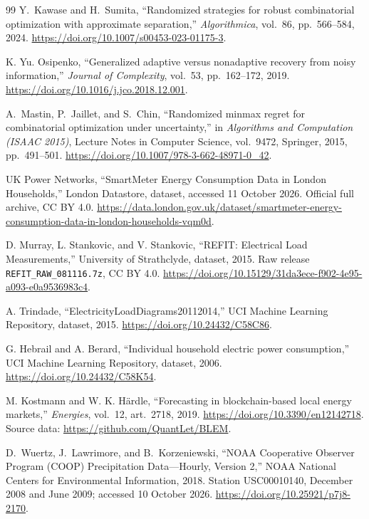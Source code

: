 \documentclass[12pt]{article}
\begin{document}
\begin{thebibliography}{99}
Y.~Kawase and H.~Sumita, ``Randomized strategies for robust combinatorial
optimization with approximate separation,'' \emph{Algorithmica}, vol.~86,
pp.~566--584, 2024. \url{https://doi.org/10.1007/s00453-023-01175-3}.

 K. Yu. Osipenko,
``Generalized adaptive versus nonadaptive recovery from noisy information,''
\emph{Journal of Complexity}, vol.~53, pp.~162--172, 2019.
\url{https://doi.org/10.1016/j.jco.2018.12.001}.

A.~Mastin, P.~Jaillet, and S.~Chin, ``Randomized minmax regret for
combinatorial optimization under uncertainty,'' in \emph{Algorithms and
Computation (ISAAC 2015)}, Lecture Notes in Computer Science, vol.~9472,
Springer, 2015, pp.~491--501.
\url{https://doi.org/10.1007/978-3-662-48971-0_42}.


 UK Power Networks, ``SmartMeter Energy Consumption Data in
London Households,'' London Datastore, dataset, accessed 11 October 2026.
Official full archive, CC BY 4.0.
\url{https://data.london.gov.uk/dataset/smartmeter-energy-consumption-data-in-london-households-vqm0d}.

 D. Murray, L. Stankovic, and V. Stankovic,
``REFIT: Electrical Load Measurements,'' University of Strathclyde, dataset,
2015. Raw release \texttt{REFIT\_RAW\_081116.7z}, CC BY 4.0.
\url{https://doi.org/10.15129/31da3ece-f902-4e95-a093-e0a9536983c4}.

 A. Trindade, ``ElectricityLoadDiagrams20112014,''
UCI Machine Learning Repository, dataset, 2015.
\url{https://doi.org/10.24432/C58C86}.

 G. Hebrail and A. Berard, ``Individual household electric
power consumption,'' UCI Machine Learning Repository, dataset, 2006.
\url{https://doi.org/10.24432/C58K54}.

 M. Kostmann and W. K. H\"ardle,
``Forecasting in blockchain-based local energy markets,''
\emph{Energies}, vol.~12, art.~2718, 2019.
\url{https://doi.org/10.3390/en12142718}.
Source data: \url{https://github.com/QuantLet/BLEM}.

D.~Wuertz, J.~Lawrimore, and B.~Korzeniewski,
``NOAA Cooperative Observer Program (COOP) Precipitation Data---Hourly,
Version 2,'' NOAA National Centers for Environmental Information, 2018.
Station USC00010140, December 2008 and June 2009; accessed 10 October 2026.
\url{https://doi.org/10.25921/p7j8-2170}.


\end{thebibliography}
\end{document}
